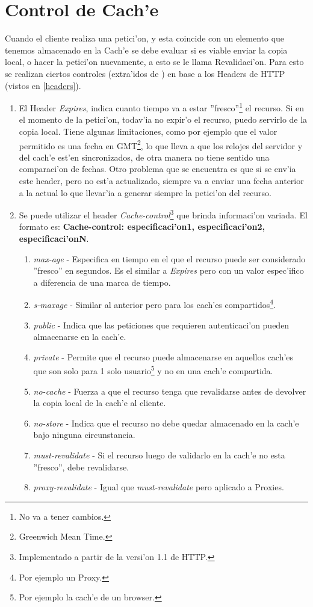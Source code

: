 \section{Control de Cach'e}
\label{controlCache}

Cuando el cliente realiza una petici'on, y esta coincide con un elemento que tenemos almacenado en la Cach'e se debe evaluar si es viable enviar la copia local, o hacer la petici'on nuevamente, a esto se le llama Revalidaci'on. Para esto se realizan ciertos controles (extra'idos de \citep{cacheDef}) en base a los Headers de HTTP (vistos en \ref{headers}).

\begin{enumerate}
\item El Header \textsl{Expires}, indica cuanto tiempo va a estar ''fresco''\footnote{No va a tener cambios.} el recurso. Si en el momento de la petici'on, todav'ia no expir'o el recurso, puedo servirlo de la copia local. Tiene algunas limitaciones, como por ejemplo que el valor permitido es una fecha en GMT\footnote{Greenwich Mean Time.}, lo que lleva a que los relojes del servidor y del cach'e est'en sincronizados, de otra manera no tiene sentido una comparaci'on de fechas. Otro problema que se encuentra es que si se env'ia este header, pero no est'a actualizado, siempre va a enviar una fecha anterior a la actual lo que llevar'ia a generar siempre la petici'on del recurso.
\item Se puede utilizar el header \textsl{Cache-control}\footnote{Implementado a partir de la versi'on 1.1 de HTTP.} que brinda informaci'on variada. El formato es: \textbf{Cache-control: especificaci'on1, especificaci'on2, especificaci'onN}.
	\begin{enumerate}
	\item \textsl{max-age} - Especifica en tiempo en el que el recurso puede ser considerado ''fresco'' en segundos. Es el similar a \textsl{Expires} pero con un valor espec'ifico a diferencia de una marca de tiempo.
	\item \textsl{s-maxage} - Similar al anterior pero para los cach'es compartidos\footnote{Por ejemplo un Proxy.}.
	\item \textsl{public} - Indica que las peticiones que requieren autenticaci'on pueden almacenarse en la cach'e.
	\item \textsl{private} - Permite que el recurso puede almacenarse en aquellos cach'es que son solo para 1 solo usuario\footnote{Por ejemplo la cach'e de un browser.} y no en una cach'e compartida.
	\item \textsl{no-cache} - Fuerza a que el recurso tenga que revalidarse antes de devolver la copia local de la cach'e al cliente.
	\item \textsl{no-store} - Indica que el recurso no debe quedar almacenado en la cach'e bajo ninguna circunstancia.
	\item \textsl{must-revalidate} - Si el recurso luego de validarlo en la cach'e no esta ''fresco'', debe revalidarse.
	\item \textsl{proxy-revalidate} - Igual que \textsl{must-revalidate} pero aplicado a Proxies.
	\end{enumerate}
\end{enumerate}

